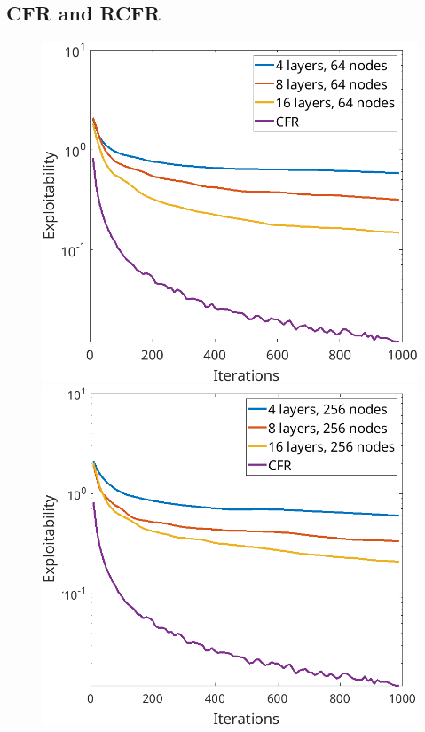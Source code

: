 \documentclass[10pt,a4paper]{article}
\begin{document}
\FloatBarrier
\subsection{CFR and RCFR}

\begin{figure}[h]
\includegraphics[scale=0.26]{Figures/rcfr_leduc_parameters1.png}
\includegraphics[scale=0.26]{Figures/rcfr_leduc_parameters2.png}

\end{figure}
\end{document}
